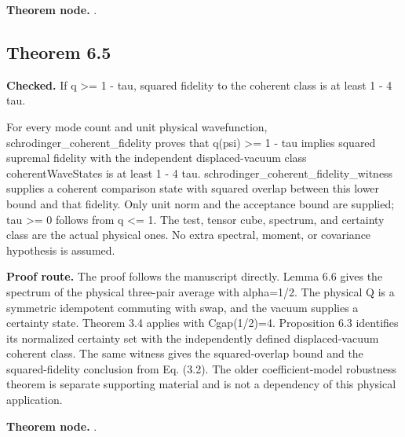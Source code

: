 \textbf{Theorem node.} .

\subsection{Theorem 6.5}\label{paper:r6-5}
\textbf{Checked.} If q >= 1 - tau, squared fidelity to the coherent class is at least 1 - 4 tau. 

For every mode count and unit physical wavefunction, schrodinger\_coherent\_fidelity proves that q(psi) >= 1 - tau implies squared supremal fidelity with the independent displaced-vacuum class coherentWaveStates is at least 1 - 4 tau. schrodinger\_coherent\_fidelity\_witness supplies a coherent comparison state with squared overlap between this lower bound and that fidelity. Only unit norm and the acceptance bound are supplied; tau >= 0 follows from q <= 1. The test, tensor cube, spectrum, and certainty class are the actual physical ones. No extra spectral, moment, or covariance hypothesis is assumed.

\textbf{Proof route.} The proof follows the manuscript directly. Lemma 6.6 gives the spectrum of the physical three-pair average with alpha=1/2. The physical Q is a symmetric idempotent commuting with swap, and the vacuum supplies a certainty state. Theorem 3.4 applies with Cgap(1/2)=4. Proposition 6.3 identifies its normalized certainty set with the independently defined displaced-vacuum coherent class. The same witness gives the squared-overlap bound and the squared-fidelity conclusion from Eq. (3.2). The older coefficient-model robustness theorem is separate supporting material and is not a dependency of this physical application.


\textbf{Theorem node.} .

